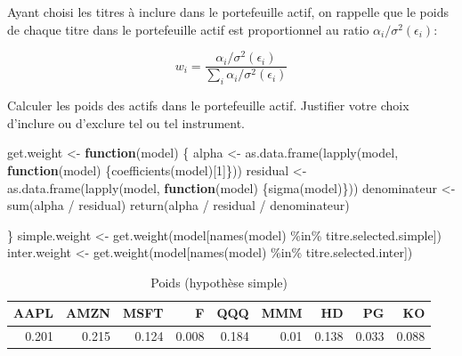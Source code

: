 \documentclass[
]{article}
\newenvironment{Shaded}{\begin{snugshade}}{\end{snugshade}}
\newcommand{\ControlFlowTok}[1]{\textcolor[rgb]{0.13,0.29,0.53}{\textbf{#1}}}
\newcommand{\DecValTok}[1]{\textcolor[rgb]{0.00,0.00,0.81}{#1}}
\newcommand{\FunctionTok}[1]{\textcolor[rgb]{0.00,0.00,0.00}{#1}}
\newcommand{\NormalTok}[1]{#1}
\newcommand{\OtherTok}[1]{\textcolor[rgb]{0.56,0.35,0.01}{#1}}
\newcommand{\SpecialCharTok}[1]{\textcolor[rgb]{0.00,0.00,0.00}{#1}}
\begin{document}
Ayant choisi les titres à inclure dans le portefeuille actif, on
rappelle que le poids de chaque titre dans le portefeuille actif est
proportionnel au ratio \(\alpha_i/\sigma^2(\epsilon_i)\):

\[
w_i = \frac{\alpha_i/\sigma^2(\epsilon_i)}{\sum_i \alpha_i/\sigma^2(\epsilon_i)}
\]

Calculer les poids des actifs dans le portefeuille actif. Justifier
votre choix d'inclure ou d'exclure tel ou tel instrument.

\begin{Shaded}
\begin{Highlighting}[]
\NormalTok{get.weight }\OtherTok{\textless{}{-}} \ControlFlowTok{function}\NormalTok{(model) \{}
\NormalTok{  alpha }\OtherTok{\textless{}{-}} \FunctionTok{as.data.frame}\NormalTok{(}\FunctionTok{lapply}\NormalTok{(model, }\ControlFlowTok{function}\NormalTok{(model) \{}\FunctionTok{coefficients}\NormalTok{(model)[}\DecValTok{1}\NormalTok{]\}))}
\NormalTok{  residual }\OtherTok{\textless{}{-}} \FunctionTok{as.data.frame}\NormalTok{(}\FunctionTok{lapply}\NormalTok{(model, }\ControlFlowTok{function}\NormalTok{(model) \{}\FunctionTok{sigma}\NormalTok{(model)\}))}
\NormalTok{  denominateur }\OtherTok{\textless{}{-}} \FunctionTok{sum}\NormalTok{(alpha }\SpecialCharTok{/}\NormalTok{ residual)}
  \FunctionTok{return}\NormalTok{(alpha }\SpecialCharTok{/}\NormalTok{ residual }\SpecialCharTok{/}\NormalTok{ denominateur)}

\NormalTok{\}}
\NormalTok{simple.weight }\OtherTok{\textless{}{-}} \FunctionTok{get.weight}\NormalTok{(model[}\FunctionTok{names}\NormalTok{(model) }\SpecialCharTok{\%in\%}\NormalTok{ titre.selected.simple])}
\NormalTok{inter.weight }\OtherTok{\textless{}{-}} \FunctionTok{get.weight}\NormalTok{(model[}\FunctionTok{names}\NormalTok{(model) }\SpecialCharTok{\%in\%}\NormalTok{ titre.selected.inter])}
\end{Highlighting}
\end{Shaded}

\begin{table}[H]

\caption{\label{tab:unnamed-chunk-14}Poids (hypothèse simple)}
\centering
\begin{tabular}[t]{rrrrrrrrr}
\toprule
AAPL & AMZN & MSFT & F & QQQ & MMM & HD & PG & KO\\
\midrule
0.201 & 0.215 & 0.124 & 0.008 & 0.184 & 0.01 & 0.138 & 0.033 & 0.088\\
\bottomrule
\end{tabular}
\end{table}
\end{document}
